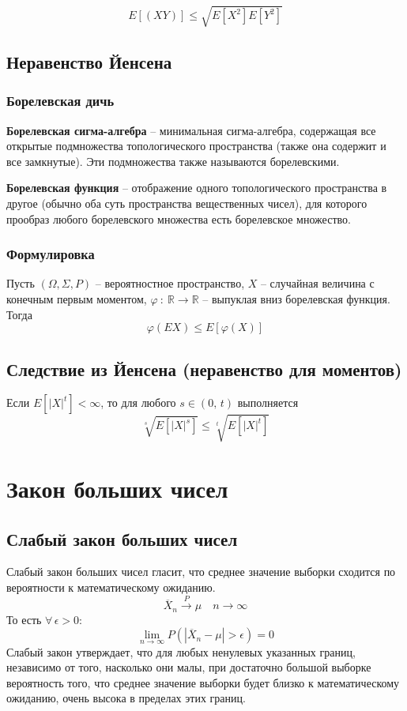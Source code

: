 \documentclass{article}
\newcommand{\R}{\mathbb{R}}
\begin{document}
$$ E[(XY)]\leq\sqrt{E[X^2]E[Y^2]} $$
\subsection{Неравенство Йенсена}
\subsubsection{Борелевская дичь}
\textbf{Борелевская сигма-алгебра} -- минимальная сигма-алгебра, содержащая все открытые подмножества топологического пространства (также она содержит и все замкнутые). Эти подмножества также называются борелевскими.

\textbf{Борелевская функция} -- отображение одного топологического пространства в другое (обычно оба суть пространства вещественных чисел), для которого прообраз любого борелевского множества есть борелевское множество.

\subsubsection{Формулировка}
Пусть $(\Omega,\Sigma,P)$ -- вероятностное пространство, $X$ -- случайная величина с конечным первым моментом, $\varphi\::\:\R\to\R$ -- выпуклая вниз борелевская функция. Тогда
$$ \varphi(EX)\leq E[\varphi(X)] $$
\subsection{Следствие из Йенсена (неравенство для моментов)}
Если $E[|X|^t]<\infty$, то для любого $s\in(0,\,t)$ выполняется
$$ \sqrt[s]{E[|X|^s]}\leq\sqrt[t]{E[|X|^t]} $$
\newpage
\section{Закон больших чисел}
\subsection{Слабый закон больших чисел}
Слабый закон больших чисел гласит, что среднее значение выборки сходится по вероятности к математическому ожиданию.
$$ \overline{X}_n\xrightarrow{P}\mu\quad n\to\infty $$
То есть $\forall\,\epsilon>0$:
$$ \lim_{n\to\infty} P(|\overline{X}_n-\mu|>\epsilon)=0 $$
Слабый закон утверждает, что для любых ненулевых указанных границ, независимо от того, насколько они малы, при достаточно большой выборке вероятность того, что среднее значение выборки будет близко к математическому ожиданию, очень высока в пределах этих границ.
\end{document}
